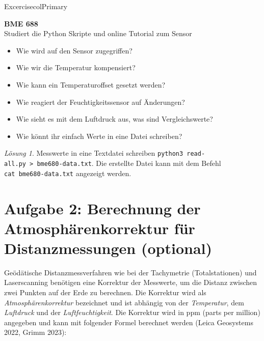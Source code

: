 \documentclass[
  11pt,
  a4paper,
  oneside, openany  ,captions=tableheading
]{scrbook}
\providecommand{\tightlist}{%
  \setlength{\itemsep}{0pt}\setlength{\parskip}{0pt}}
\theoremstyle{remark}
\newtheorem*{solution}{Lösung}
\renewcommand{\markright}[1]{\def\chaptertitle{#1}} %
\begin{document}
\begin{boxtitle}{Excercise}{colPrimary}

\textbf{BME 688}\\
Studiert die Python Skripte und online Tutorial zum Sensor

\begin{itemize}
\tightlist
\item
  Wie wird auf den Sensor zugegriffen?
\item
  Wie wir die Temperatur kompensiert?
\item
  Wie kann ein Temperaturoffset gesetzt werden?
\item
  Wie reagiert der Feuchtigkeitssensor auf Änderungen?
\item
  Wie sieht es mit dem Luftdruck aus, was sind Vergleichswerte?
\item
  Wie könnt ihr einfach Werte in eine Datei schreiben?
\end{itemize}

\end{boxtitle}

\begin{solution}
Messwerte in eine Textdatei schreiben
\texttt{python3\ read-all.py\ \textgreater{}\ bme680-data.txt}. Die
erstellte Datei kann mit dem Befehl \texttt{cat\ bme680-data.txt}
angezeigt werden.
\end{solution}

\section*{Aufgabe 2: Berechnung der Atmosphärenkorrektur für
Distanzmessungen
(optional)}\label{aufgabe-2-berechnung-der-atmosphuxe4renkorrektur-fuxfcr-distanzmessungen-optional}

\markright{Aufgabe 2: Berechnung der Atmosphärenkorrektur für
Distanzmessungen (optional)}

Geödätische Distanzmessverfahren wie bei der Tachymetrie
(Totalstationen) und Laserscanning benötigen eine Korrektur der
Messwerte, um die Distanz zwischen zwei Punkten auf der Erde zu
berechnen. Die Korrektur wird als \emph{Atmosphärenkorrektur} bezeichnet
und ist abhängig von der \emph{Temperatur}, dem \emph{Luftdruck} und der
\emph{Luftfeuchtigkeit}. Die Korrektur wird in ppm (parts per million)
angegeben und kann mit folgender Formel berechnet werden (Leica
Geosystems 2022, Grimm 2023):
\end{document}
